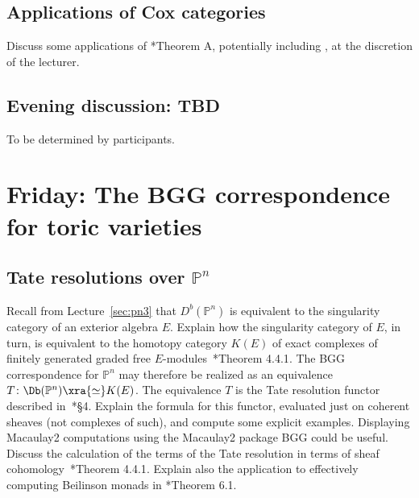 \documentclass[11pt]{amsart}
\numberwithin{equation}{section}
\theoremstyle{definition}
\theoremstyle{remark}
\newcommand{\PP}{\mathbb P}
\def\co{\colon}
\begin{document}
\subsection{Applications of Cox categories}
Discuss some applications of \cite{BBB+24}*{Theorem A}, potentially including \cite[Proposition 1.3, Theorems 1.4, 1.5]{BBB+24}, at the discretion of the lecturer.


\subsection*{Evening discussion: TBD}  To be determined by participants.

\section{Friday: The BGG correspondence for toric varieties}

\subsection{Tate resolutions over $\PP^n$}
Recall from Lecture~\ref{sec:pn3} that $D^b(\PP^n)$ is equivalent to the singularity category of an exterior algebra $E$. Explain how the singularity category of $E$, in turn, is equivalent to the homotopy category $K(E)$ of exact complexes of finitely generated graded free $E$-modules~\cite{Buchweitz2021}*{Theorem 4.4.1}. The BGG correspondence for $\PP^n$ may therefore be realized as an equivalence $T \co \Db(\PP^n) \xra{\simeq} K(E)$. The equivalence $T$ is the Tate resolution functor described in~\cite{EFS03}*{\S 4}. Explain the formula for this functor, evaluated just on coherent sheaves (not complexes of such), and compute some explicit examples. Displaying Macaulay2 computations using the Macaulay2 package BGG could be useful. Discuss the calculation of the terms of the Tate resolution in terms of sheaf cohomology~\cite{EFS03}*{Theorem 4.4.1}. Explain also the application to effectively computing Beilinson monads in \cite{EFS03}*{Theorem 6.1}. 
\end{document}
